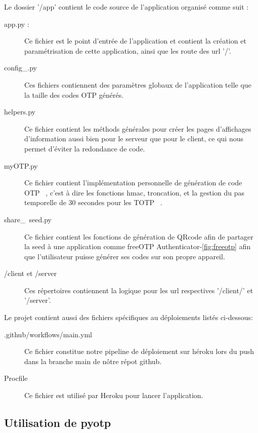 \documentclass[a4paper, 10pt]{article}
\newcommand{\otp}{\textsc{OTP} }
\newcommand{\totp}{\textsc{TOTP} }
\begin{document}
\noindent
Le dossier '/app' contient le code source de l'application organisé comme suit :
\begin{description}
    \item[app.py :]
    Ce fichier est le point d'entrée de l'application et contient la \textcolor{myblue}{création et paramétrisation} de cette application, ainsi que les route des url '/'.
    \item[config\_\*.py]
    Ces fichiers contiennent des \textcolor{myblue}{paramètres globaux} de l'application telle que la taille des codes \otp générés.
    \item[helpers.py]
    Ce fichier contient les méthods générales pour créer les pages d'\textcolor{myblue}{affichages d'information} aussi bien pour le serveur que pour le client, ce qui nous permet d'éviter la redondance de code.
    \item[myOTP.py]
    Ce fichier contient l'\textcolor{myblue}{implémentation personnelle} de génération de code \otp\ , c'est à dire les fonctions \textcolor{mygreen}{hmac}, \textcolor{mygreen}{troncation}, et la \textcolor{mygreen}{gestion du pas temporelle} de 30 secondes pour les \totp\ .
    \item[share\_\ seed.py]
    Ce fichier contient les fonctions de \textcolor{myblue}{génération de QRcode} afin de partager la seed à une application comme \textcolor{mygreen}{freeOTP Authenticator-\ref{fig:freeotp}} afin que l'utilisateur puisse générer ses codes sur son propre appareil.
    \item[/client et /server] 
    Ces répertoires contiennent la logique pour les url respectives '/client/' et '/server'.\\
\end{description}

\noindent
Le projet contient aussi des fichiers spécifiques au déploiements listés ci-dessous:
\begin{description}
    \item[.github/workflows/main.yml] 
    Ce fichier constitue notre \textcolor{myblue}{pipeline de déploiement} sur \textcolor{mygreen}{héroku} lors du push dans la branche main de nôtre répot github.
    \item[Procfile] 
    Ce fichier est utilisé par Heroku pour \textcolor{myblue}{lancer l'application}.\\
\end{description}


    \subsection{Utilisation de pyotp}
\end{document}
